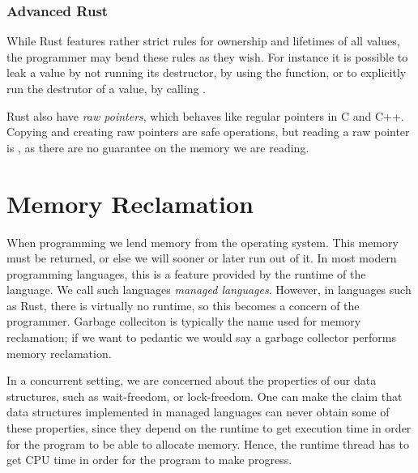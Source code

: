 \documentclass[a4paper,twoside]{article}
\begin{document}

\subsubsection{Advanced Rust}
While Rust features rather strict rules for ownership and lifetimes of all values,
the programmer may bend these rules as they wish.
For instance it is possible to leak a value by not running its destructor,
by using the  function, or to explicitly run the destrutor of
a value, by calling .

Rust also have \emph{raw pointers}, which behaves like regular pointers in C and C++.
Copying and creating raw pointers are safe operations, but reading a raw pointer is
, as there are no guarantee on the memory we are reading.




\section{Memory Reclamation}

When programming we lend memory from the operating system. This memory must be returned, or else
we will sooner or later run out of it.
In most modern programming languages, this is a feature provided by the runtime of the language.
We call such languages \emph{managed languages}.
However, in languages such as Rust, there is virtually no runtime, so this becomes a concern
of the programmer.
Garbage colleciton is typically the name used for memory reclamation;
if we want to pedantic we would say a garbage collector performs memory reclamation.

In a concurrent setting, we are concerned about the properties of our data structures,
such as wait-freedom, or lock-freedom.
One can make the claim that data structures implemented in managed languages can never
obtain some of these properties, since they depend on the runtime to get execution time
in order for the program to be able to allocate memory.
Hence, the runtime thread has to get CPU time in order for the program to make progress.
\end{document}
